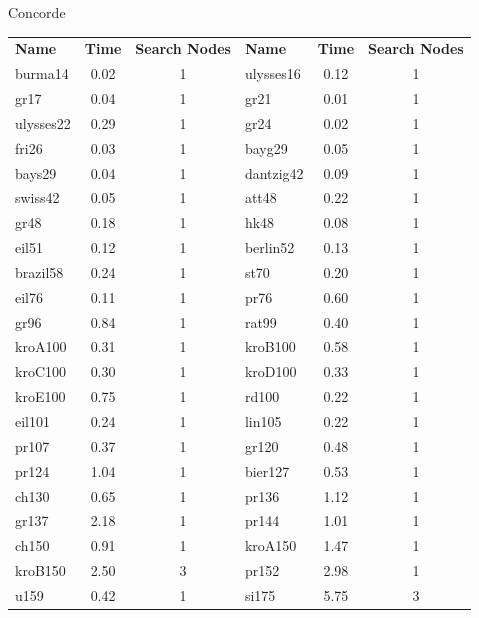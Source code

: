 \documentclass{beamer}
\begin{document}
  \begin{frame}[t]{Concorde}
    \begin{table}\scriptsize
    \begin{tabularx}{\textwidth}{l c c | l c c}
      \textbf{Name} & \textbf{Time} & \textbf{Search Nodes} & \textbf{Name} & \textbf{Time} & \textbf{Search Nodes} \\
  burma14&0.02&1& ulysses16&0.12&1 \\
  gr17&0.04&1&  gr21&0.01&1 \\
  ulysses22&0.29&1& gr24&0.02&1 \\
  fri26&0.03&1& bayg29&0.05&1 \\
  bays29&0.04&1&  dantzig42&0.09&1 \\
  swiss42&0.05&1& att48&0.22&1 \\
  gr48&0.18&1&  hk48&0.08&1 \\
  eil51&0.12&1& berlin52&0.13&1 \\
  brazil58&0.24&1&  st70&0.20&1 \\
  eil76&0.11&1& pr76&0.60&1 \\
  gr96&0.84&1&  rat99&0.40&1 \\
  kroA100&0.31&1& kroB100&0.58&1 \\
  kroC100&0.30&1& kroD100&0.33&1 \\
  kroE100&0.75&1& rd100&0.22&1 \\
  eil101&0.24&1&  lin105&0.22&1 \\
  pr107&0.37&1& gr120&0.48&1 \\
  pr124&1.04&1& bier127&0.53&1 \\
  ch130&0.65&1& pr136&1.12&1 \\
  gr137&2.18&1& pr144&1.01&1 \\
  ch150&0.91&1& kroA150&1.47&1 \\
  kroB150&2.50&3& pr152&2.98&1 \\
  u159&0.42&1&  si175&5.75&3 \\
  \end{tabularx}
  \end{table}
  \end{frame}
\end{document}

